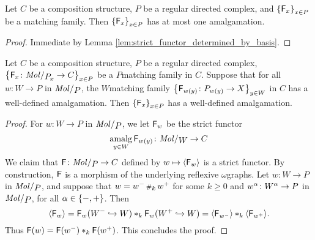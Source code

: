 \begin{lem}\label{lem:at_most_one_lift}
    Let \( C \) be a composition structure, \( P \) be a regular directed complex, and \( \left\{ {\mathsf{F}_x} \right\}_{x \in P} \) be a matching family. 
    Then \( \left\{ {\mathsf{F}_x} \right\}_{x \in P} \) has at most one amalgamation.
\end{lem}
\begin{proof}
    Immediate by Lemma \ref{lem:strict_functor_determined_by_basis}.
\end{proof}

\begin{lem} \label{lem:well_define_from_regular_iff_well_defined_from_molecules}
    Let \( C \) be a composition structure, \( P \) be a regular directed complex, \( \set{\F_x \colon \molecin{\imel{P}{x}} \to C}_{x \in P} \) be a \( P \)\nbd matching family in \( C \). 
    Suppose that for all \( w \colon W \to P \) in \( \molecin{P} \), the \( W \)\nbd matching family \( \left\{ {\mathsf{F}_{w(y)} \colon {P}_{w(y)} \to X} \right\}_{y \in W} \) in \( C \) has a well-defined amalgamation.
    Then \( \left\{ {\mathsf{F}_x} \right\}_{x \in P} \) has a well-defined amalgamation.
\end{lem}
\begin{proof}
    For \( w \colon W \to P \) in \( \molecin{P} \), we let \( \mathsf{F}_w \) be the strict functor 
    \begin{equation*}
        \amalg_{y \in W} \F_{w(y)} \colon \molecin{W} \to C
    \end{equation*}
    We claim that \( \F \colon \molecin{P} \to C \) defined by \( w \mapsto \langle\mathsf{F}_w\rangle \) is a strict functor.
    By construction, \( \mathsf{F} \) is a morphism of the underlying reflexive \( \omega \)\nbd graphs.
    Let \( w \colon W \to P \) in \( \molecin{P} \), and suppose that \( w = w^- \,{\scriptstyle\#}_{k}\, w^+ \) for some \( k \geq 0 \) and \( w^\alpha \colon W^\alpha \to P \) in \( \molecin{P} \), for all \( \alpha \in \left\{ {-, +} \right\} \).
    Then
    \begin{equation*}
        \langle\mathsf{F}_w\rangle = \mathsf{F}_w(W^- \hookrightarrow W) *_{k} \mathsf{F}_w(W^+ \hookrightarrow W) = \langle\mathsf{F}_{w^-}\rangle *_{k} \langle\mathsf{F}_{w^+}\rangle.
    \end{equation*}
    Thus \( \mathsf{F}(w) = \mathsf{F}(w^-) *_{k} \mathsf{F}(w^+) \).
    This concludes the proof.
\end{proof}

